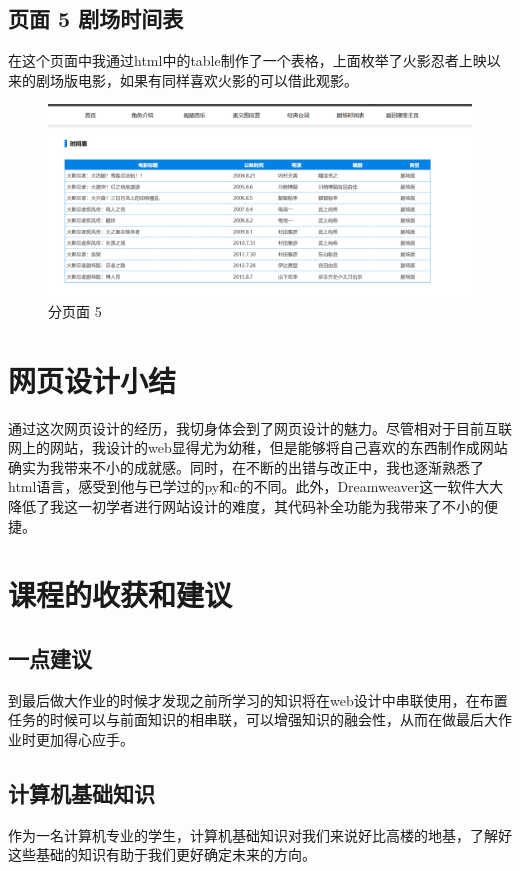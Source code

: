 \documentclass[supercite]{Experimental_Report}
\theoremstyle{definition}
\begin{document}
\newpage

\subsection{页面 5 剧场时间表}
在这个页面中我通过html中的table制作了一个表格，上面枚举了火影忍者上映以来的剧场版电影，如果有同样喜欢火影的可以借此观影。


\begin{figure}[h]
	\centering
\includegraphics[scale=0.3]{images/2-6.png}
\caption{分页面 5}
\label{fig2-6}
\end{figure}

\newpage

\section{网页设计小结}
通过这次网页设计的经历，我切身体会到了网页设计的魅力。尽管相对于目前互联网上的网站，我设计的web显得尤为幼稚，但是能够将自己喜欢的东西制作成网站确实为我带来不小的成就感。同时，在不断的出错与改正中，我也逐渐熟悉了html语言，感受到他与已学过的py和c的不同。此外，Dreamweaver这一软件大大降低了我这一初学者进行网站设计的难度，其代码补全功能为我带来了不小的便捷。

\section{课程的收获和建议}
\subsection{一点建议}
到最后做大作业的时候才发现之前所学习的知识将在web设计中串联使用，在布置任务的时候可以与前面知识的相串联，可以增强知识的融会性，从而在做最后大作业时更加得心应手。

\subsection{计算机基础知识}
作为一名计算机专业的学生，计算机基础知识对我们来说好比高楼的地基，了解好这些基础的知识有助于我们更好确定未来的方向。
\end{document}
